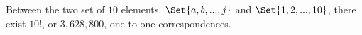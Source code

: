 \label{ch2ex:18}
Between the two set of $10$ elements, $\Set{a,b,...,j}$ and
$\Set{1,2,...,10}$, there exist $10!$, or $3,628,800$, one-to-one
correspondences.
